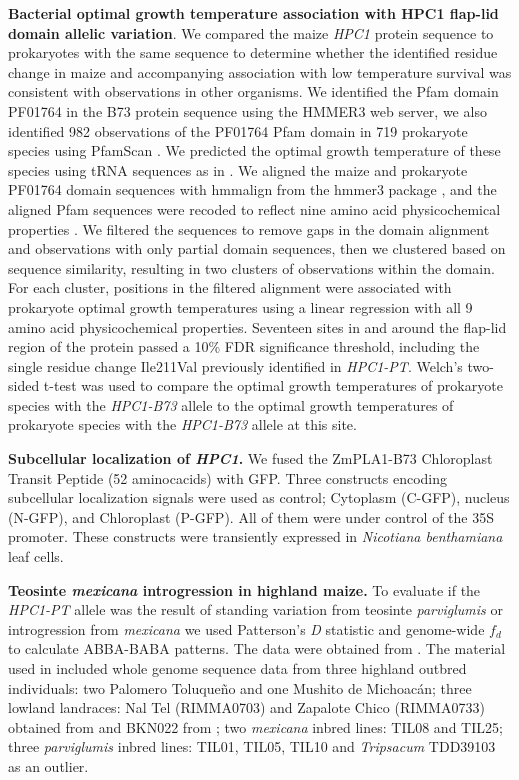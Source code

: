 \documentclass[9pt,twocolumn,twoside,lineno]{BioRxiv}
\begin{document}
\textbf{Bacterial optimal growth temperature association with HPC1 flap-lid domain allelic variation}.
We compared the maize \textit{HPC1} protein sequence to prokaryotes with the same sequence to determine whether the identified residue change in maize and accompanying association with low temperature survival was consistent with observations in other organisms. 
We identified the Pfam domain PF01764 in the B73 protein sequence using the HMMER3 web server, we also identified 982 observations of the PF01764 Pfam domain in 719 prokaryote species using PfamScan \cite{Potter2018-tk, El-Gebali2019-pw}. 
We predicted the optimal growth temperature of these species using tRNA sequences as in \cite{Cimen2020-dm}. 
We aligned the maize and prokaryote PF01764 domain sequences with hmmalign from the hmmer3 package \cite{Eddy2011-pd}, and the aligned Pfam sequences were recoded to reflect nine amino acid physicochemical properties \cite{Li2016-ut}. 
We filtered the sequences to remove gaps in the domain alignment and observations with only partial domain sequences, then we clustered based on sequence similarity, resulting in two clusters of observations within the domain. 
For each cluster, positions in the filtered alignment were associated with prokaryote optimal growth temperatures using a linear regression with all 9 amino acid physicochemical properties. 
Seventeen sites in and around the flap-lid region of the protein passed a 10\% FDR significance threshold, including the single residue change Ile211Val previously identified in \textit{HPC1-PT}. 
Welch’s two-sided t-test was used to compare the optimal growth temperatures of prokaryote species with the \textit{HPC1-B73} allele to the optimal growth temperatures of prokaryote species with the \textit{HPC1-B73} allele at this site.

\textbf{Subcellular localization of \textit{HPC1}.}
We fused the ZmPLA1-B73 Chloroplast Transit Peptide (52 aminocacids) with GFP. %
Three constructs encoding subcellular localization signals were used as control; Cytoplasm (C-GFP), nucleus (N-GFP), and Chloroplast (P-GFP). 
All of them were under control of the 35S promoter. 
These constructs were transiently expressed in \textit{Nicotiana benthamiana} leaf cells.

\textbf{Teosinte \textit{mexicana} introgression in highland maize.}
To evaluate if the \textit{HPC1-PT} allele was the result of standing variation from teosinte \textit{parviglumis} or introgression from \textit{mexicana} we used Patterson's \textit{D} statistic and genome-wide $f_{d}$ to calculate ABBA-BABA patterns. 
The data were obtained from \cite{Gonzalez-Segovia2019-jy}. 
The material used in \cite{Gonzalez-Segovia2019-jy} included whole genome sequence data from three highland outbred individuals: two Palomero Toluqueño and one Mushito de Michoacán; three lowland landraces: Nal Tel (RIMMA0703) and Zapalote Chico (RIMMA0733) obtained from \cite{Wang2017-bc} and  BKN022 from \cite{Bukowski2017-ng}; two \textit{mexicana} inbred lines: TIL08 and TIL25; three \textit{parviglumis} inbred lines: TIL01, TIL05, TIL10 and \textit{Tripsacum} TDD39103 \cite{Bukowski2017-ng} as an outlier. 
\end{document}
